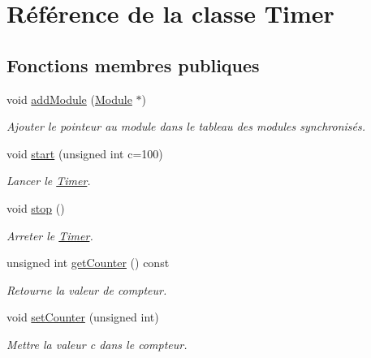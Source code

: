 \hypertarget{classTimer}{\section{Référence de la classe Timer}
\label{classTimer}
}
\subsection*{Fonctions membres publiques}
\begin{DoxyCompactItemize}
\item 
\hypertarget{classTimer_a0472ea751f9f13fd7710cce4507bb656}{void \hyperlink{classTimer_a0472ea751f9f13fd7710cce4507bb656}{add\-Module} (\hyperlink{classModule}{Module} $\ast$)}\label{classTimer_a0472ea751f9f13fd7710cce4507bb656}

\begin{DoxyCompactList}\small\item\em Ajouter le pointeur au module dans le tableau des modules synchronisés. \end{DoxyCompactList}\item 
\hypertarget{classTimer_a62869fa83e1b76a9ebfe9cca7e56733d}{void \hyperlink{classTimer_a62869fa83e1b76a9ebfe9cca7e56733d}{start} (unsigned int c=100)}\label{classTimer_a62869fa83e1b76a9ebfe9cca7e56733d}

\begin{DoxyCompactList}\small\item\em Lancer le \hyperlink{classTimer}{Timer}. \end{DoxyCompactList}\item 
\hypertarget{classTimer_a63f0eb44b27402196590a03781515dba}{void \hyperlink{classTimer_a63f0eb44b27402196590a03781515dba}{stop} ()}\label{classTimer_a63f0eb44b27402196590a03781515dba}

\begin{DoxyCompactList}\small\item\em Arreter le \hyperlink{classTimer}{Timer}. \end{DoxyCompactList}\item 
\hypertarget{classTimer_a03ffd75bbb89ff1644839523af9fda03}{unsigned int \hyperlink{classTimer_a03ffd75bbb89ff1644839523af9fda03}{get\-Counter} () const }\label{classTimer_a03ffd75bbb89ff1644839523af9fda03}

\begin{DoxyCompactList}\small\item\em Retourne la valeur de compteur. \end{DoxyCompactList}\item 
\hypertarget{classTimer_a7394d4c4edb4d951dbe2c7e1ab2fb7ae}{void \hyperlink{classTimer_a7394d4c4edb4d951dbe2c7e1ab2fb7ae}{set\-Counter} (unsigned int)}\label{classTimer_a7394d4c4edb4d951dbe2c7e1ab2fb7ae}

\begin{DoxyCompactList}\small\item\em Mettre la valeur c dans le compteur. \end{DoxyCompactList}\end{DoxyCompactItemize}
